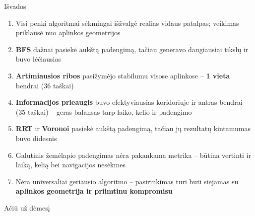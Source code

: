 \documentclass[12pt]{beamer}
\begin{document}
\begin{frame}{Išvados}
    \begin{enumerate}
        \item Visi penki algoritmai sėkmingai išžvalgė realias vidaus patalpas; veikimas priklausė nuo aplinkos geometrijos
        \item \textbf{BFS} dažnai pasiekė aukštą padengimą, tačiau generavo daugiausiai tikslų ir buvo lėčiausias
        \item \textbf{Artimiausios ribos} pasižymėjo stabilumu visose aplinkose -- \textbf{1 vieta} bendrai (36 taškai)
        \item \textbf{Informacijos prieaugis} buvo efektyviausias koridoriuje ir antras bendrai (35 taškai) -- geras balansas tarp laiko, kelio ir padengimo
        \item \textbf{RRT} ir \textbf{Voronoi} pasiekė aukštą padengimą, tačiau jų rezultatų kintamumas buvo didesnis
        \item Galutinis žemėlapio padengimas nėra pakankama metrika -- būtina vertinti ir laiką, kelią bei navigacijos nesėkmes
        \item Nėra universaliai geriausio algoritmo -- pasirinkimas turi būti siejamas su \textbf{aplinkos geometrija ir priimtinu kompromisu}
    \end{enumerate}
\end{frame}

\begin{frame}
    \begin{center}
        \Huge Ačiū už dėmesį
    \end{center}
\end{frame}
\end{document}
